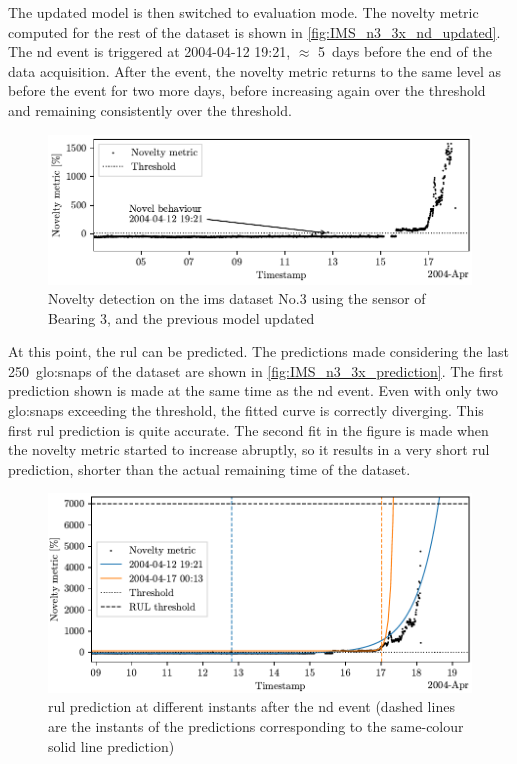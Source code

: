The updated model is then switched to evaluation mode. The novelty metric computed for the rest of the dataset is shown in \autoref{fig:IMS_n3_3x_nd_updated}. The \gls{nd} event is triggered at 2004-04-12 19:21, $\approx$ 5~days before the end of the data acquisition. After the event, the novelty metric returns to the same level as before the event for two more days, before increasing again over the threshold and remaining consistently over the threshold.

\begin{figure}
    \centering
    \includegraphics[width=\textwidth]{images/IMS/Test03/ND.pdf}
    \caption{Novelty detection on the \gls{ims} dataset No.3 using the sensor of Bearing 3, and the previous model updated}
    \label{fig:IMS_n3_3x_nd_updated}
\end{figure}

At this point, the \gls{rul} can be predicted. The predictions made considering the last 250~\gls{glo:snap}s of the dataset are shown in \autoref{fig:IMS_n3_3x_prediction}. The first prediction shown is made at the same time as the \gls{nd} event. Even with only two \gls{glo:snap}s exceeding the threshold, the fitted curve is correctly diverging. This first \gls{rul} prediction is quite accurate. The second fit in the figure is made when the novelty metric started to increase abruptly, so it results in a very short \gls{rul} prediction, shorter than the actual remaining time of the dataset.

\begin{figure}
    \centering
    \includegraphics[width=\textwidth]{images/IMS/Test03/RUL.pdf}
    \caption{\gls{rul} prediction at different instants after the \gls{nd} event (dashed lines are the instants of the predictions corresponding to the same-colour solid line prediction)}
    \label{fig:IMS_n3_3x_prediction}
\end{figure}

